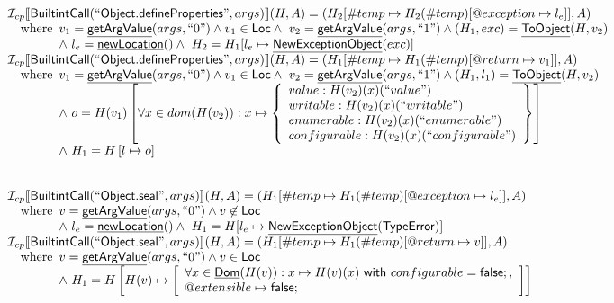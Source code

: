 \documentclass{article}
\makeatletter
\newcommand{\SF}[1]{\mbox{\textsf{#1}}}
\newcommand{\wherec}[1]{{\rm where}\begin{array}[t]{l}#1\end{array}}
\newcommand{\Loc}{\SF{Loc}}
\newcommand{\I}{\mathcal{I}}
\newcommand{\lbr}{\llbracket}
\newcommand{\rbr}{\rrbracket}
\newcommand{\hf}[1]{\underline{\sf #1}}
\newcommand{\varloc}[1]{\##1}
\newcommand{\varprop}[1]{@#1}
\newcommand{\rwith}{~{\sf with}~}
\makeatother
\begin{document}
\[\begin{array}{l}
\I _{cp}\lbr \SF{BuiltintCall}(``\SF{Object.defineProperties}",args)\rbr(H,A)
 = (H_2[\varloc{temp}\mapsto H_2(\varloc{temp})[\varprop{exception}\mapsto l_{e}]], A) \\
\quad\wherec{
  v_1 = \hf{getArgValue}(args, ``0") \land v_1 \in\Loc
  \land\ v_2 = \hf{getArgValue}(args, ``1") \land (H_1, exc) = \hf{ToObject}(H, v_2)\\
  \land\ l_e = \hf{newLocation}() \land\ H_2=H_1[l_e\mapsto\hf{NewExceptionObject}(exc)] }\\

\I _{cp}\lbr \SF{BuiltintCall}(``\SF{Object.defineProperties}",args)\rbr(H,A)
 = (H_1[\#temp \mapsto H_1(\#temp)[@return \mapsto v_1]], A)\\
\quad\wherec{
  v_1 = \hf{getArgValue}(args, ``0") \land v_1 \in\Loc
  \land\ v_2 = \hf{getArgValue}(args, ``1") \land (H_1, l_1) = \hf{ToObject}(H, v_2)\\
  \land\ o = H(v_1)\left[
    \forall x\in dom(H(v_2)): x \mapsto \left\{
      \begin{array}{l}
        value: H(v_2)(x)(``value")\\
        writable: H(v_2)(x)(``writable") \\
        enumerable: H(v_2)(x)(``enumerable")\\
        configurable: H(v_2)(x)(``configurable")\\
      \end{array}
      \right\}
    \right]\\ 
  \land\ H_1=H\left[l\mapsto o\right]}\\
\\\\

\I _{cp}\lbr \SF{BuiltintCall}(``\SF{Object.seal}",args)\rbr(H,A)
 = (H_1[\varloc{temp}\mapsto H_1(\varloc{temp})[\varprop{exception}\mapsto l_{e}]], A) \\
\quad\wherec{
  v = \hf{getArgValue}(args, ``0") \land v\not\in\Loc\\
  \land\ l_e = \hf{newLocation}() \land\ H_1=H[l_e\mapsto\hf{NewExceptionObject}(\SF{TypeError})] }\\
  
\I _{cp}\lbr \SF{BuiltintCall}(``\SF{Object.seal}",args)\rbr(H,A)
 = (H_1[\varloc{temp}\mapsto H_1(\varloc{temp})[\varprop{return}\mapsto v]], A) \\
\quad\wherec{
  v = \hf{getArgValue}(args, ``0") \land v  \in\Loc\\
  \land\ H_1 = H\left[H(v) \mapsto \left[
    \begin{array}{l}
      \forall x \in \hf{Dom}(H(v)):x \mapsto H(v)(x)\rwith configurable=\SF{false};, \\
      \varprop{extensible} \mapsto \SF{false};
    \end{array}\right]\right]\\
   }\\
\\\\


\end{array}\]
\end{document}
